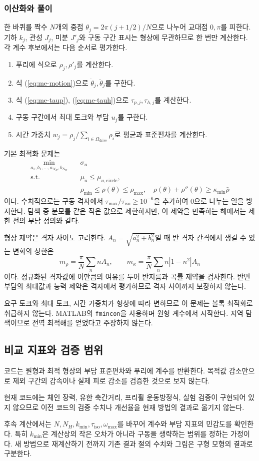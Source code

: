 \subsubsection{이산화와 풀이}
한 바퀴를 짝수 \(N\)개의 중점 \(\theta_j=2\pi(j+1/2)/N\)으로 나누어 교대점 \(0,\pi\)를 피한다. 기하 \(k_j\), 관성 \(J_j\), 미분 \(J'_j\)와 구동 구간 표시는 형상에 무관하므로 한 번만 계산한다. 각 계수 후보에서는 다음 순서로 평가한다.
\begin{enumerate}
\item 푸리에 식으로 \(\rho_j,\rho'_j\)를 계산한다.
\item 식 (\ref{eq:me-motion})으로 \(\dot\theta_j,\ddot\theta_j\)를 구한다.
\item 식 (\ref{eq:me-taup}), (\ref{eq:me-tauh})으로 \(\tau_{p,j},\tau_{h,j}\)를 계산한다.
\item 구동 구간에서 최대 토크와 부담 \(u_j\)를 구한다.
\item 시간 가중치 \(w_j=\rho_j/\sum_{i\in\Omega_{\mathrm{drive}}}\rho_i\)로 평균과 표준편차를 계산한다.
\end{enumerate}
기본 최적화 문제는
\begin{equation}
\begin{aligned}
\min_{a_1,b_1,\ldots,a_{N_H},b_{N_H}}\quad &\sigma_u\\
\text{s.t.}\quad &\mu_u\leq\mu_{u,\mathrm{circle}},\\
&\rho_{\min}\leq\rho(\theta)\leq\rho_{\max},\quad
\rho(\theta)+\rho''(\theta)\geq\kappa_{\min}\bar\rho
\end{aligned}
\label{eq:opt}
\end{equation}
이다. 수치적으로는 구동 격자에서 \(\tau_{\max}/\tau_{\mathrm{iso}}\geq10^{-6}\)을 추가하여 0으로 나누는 일을 방지한다. 탐색 중 분모를 같은 작은 값으로 제한하지만, 이 제약을 만족하는 해에서는 제한 전의 부담 정의와 같다.

형상 제약은 격자 사이도 고려한다. \(A_n=\sqrt{a_n^2+b_n^2}\)일 때 반 격자 간격에서 생길 수 있는 변화의 상한은
\[
m_\rho=\frac{\pi}{N}\sum_n nA_n,\qquad
m_\kappa=\frac{\pi}{N}\sum_n n|1-n^2|A_n
\]
이다. 정규화된 격자값에 이만큼의 여유를 두어 반지름과 곡률 제약을 검사한다. 반면 부담의 최대값과 능력 제약은 격자에서 평가하므로 격자 사이까지 보장하지 않는다.

요구 토크와 최대 토크, 시간 가중치가 형상에 따라 변하므로 이 문제는 볼록 최적화로 취급하지 않는다. MATLAB의 \texttt{fmincon}을 사용하며 원형 계수에서 시작한다. 지역 탐색이므로 전역 최적해를 얻었다고 주장하지 않는다.

\subsection{비교 지표와 검증 범위}
코드는 원형과 최적 형상의 부담 표준편차와 푸리에 계수를 반환한다. 목적값 감소만으로 제외 구간의 감속이나 실제 피로 감소를 검증한 것으로 보지 않는다.

현재 코드에는 체인 장력, 유한 축간거리, 프리휠 운동방정식, 실험 검증이 구현되어 있지 않으므로 이전 코드의 검증 수치나 개선율을 현재 방법의 결과로 옮기지 않는다.

후속 계산에서는 \(N,N_H,k_{\min},\tau_{\mathrm{iso}},\omega_{\max}\)를 바꾸어 계수와 부담 지표의 민감도를 확인한다. 특히 \(k_{\min}\)은 계산상의 작은 오차가 아니라 구동을 생략하는 범위를 정하는 가정이다. 새 방법으로 재계산하기 전까지 기존 결과 절의 수치와 그림은 구형 모형의 결과로 구분한다.
